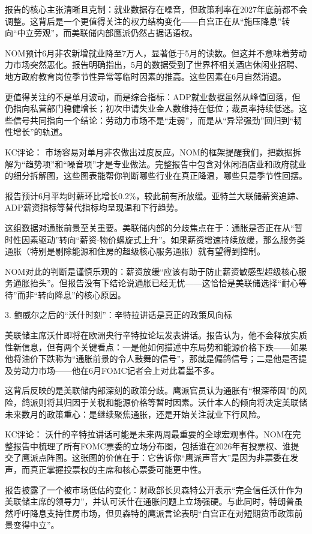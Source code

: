 \documentclass[11pt]{ctexart}
\begin{document}
报告的核心主张清晰且克制：就业数据存在噪音，但政策利率在2027年底前都不会调整。这背后是一个更值得关注的权力结构变化——白宫正在从“施压降息”转向“中立旁观”，而美联储内部鹰派仍然占据话语权。

NOM预计6月非农新增就业降至7万人，显著低于5月的读数。但这并不意味着劳动力市场突然恶化。报告明确指出，5月的数据受到了世界杯相关酒店休闲业招聘、地方政府教育岗位季节性异常等临时因素的推高。这些因素在6月自然消退。

更值得关注的不是单月波动，而是综合指标：ADP就业数据虽然从峰值回落，但仍指向私营部门稳健增长；初次申请失业金人数维持在低位；裁员率持续低迷。这些信号共同指向一个结论：劳动力市场不是“走弱”，而是从“异常强劲”回归到“韧性增长”的轨道。

KC评论： 市场容易对单月非农做出过度反应。NOM的框架提醒我们，把数据拆解为“趋势项”和“噪音项”才是专业做法。完整报告中包含对休闲酒店业和政府就业的细分拆解图，这些图表能帮你判断哪些行业在真正降温，哪些只是季节性回摆。

报告预计6月平均时薪环比增长0.2\%，较此前有所放缓。亚特兰大联储薪资追踪、ADP薪资指标等替代指标均呈现温和下行趋势。

这组数据对通胀前景至关重要。美联储内部的分歧焦点在于：通胀是否正在从“暂时性因素驱动”转向“薪资-物价螺旋式上升”。如果薪资增速持续放缓，那么服务类通胀（特别是剔除能源和住房的超级核心服务通胀）就有望得到控制。

NOM对此的判断是谨慎乐观的：薪资放缓“应该有助于防止薪资敏感型超级核心服务通胀抬头”。但报告没有下结论说通胀已经无忧——这恰恰是美联储选择“耐心等待”而非“转向降息”的核心原因。

3. 鲍威尔之后的“沃什时刻”：辛特拉讲话是真正的政策风向标

美联储主席沃什即将在欧洲央行辛特拉论坛发表讲话。报告认为，他不会释放实质性新信息，但有两个关键看点：一是他如何描述中东局势和能源价格下跌——如果他将油价下跌称为“通胀前景的令人鼓舞的信号”，那就是偏鸽信号；二是他是否提及劳动力市场——他在6月FOMC记者会上对此着墨不多。

这背后反映的是美联储内部深刻的政策分歧。鹰派官员认为通胀有“根深蒂固”的风险，鸽派则将其归因于关税和能源价格等暂时因素。沃什本人的倾向将决定美联储未来数月的政策重心：是继续聚焦通胀，还是开始关注就业下行风险。

KC评论： 沃什的辛特拉讲话可能是未来两周最重要的全球宏观事件。NOM在完整报告中梳理了所有FOMC票委的立场分布图，包括谁在2026年有投票权、谁提交了鹰派点阵图。这张图的价值在于：它告诉你“鹰派声音大”是因为非票委在发声，而真正掌握投票权的主席和核心票委可能更中性。

报告披露了一个被市场低估的变化：财政部长贝森特公开表示“完全信任沃什作为美联储主席的领导力”，并认可沃什在通胀问题上立场强硬。与此同时，特朗普虽然呼吁降息支持住房市场，但贝森特的鹰派言论表明“白宫正在对短期货币政策前景变得中立”。
\end{document}
